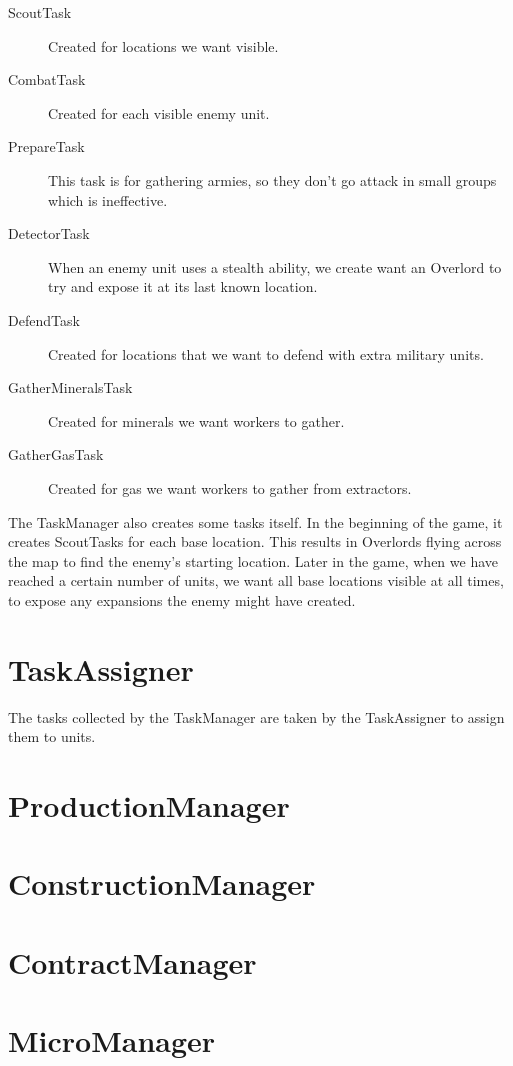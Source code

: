 \begin{description}
\item[ScoutTask] Created for locations we want visible.
\item[CombatTask] Created for each visible enemy unit.
\item[PrepareTask] This task is for gathering armies, so they don't go attack in small groups which is ineffective.
\item[DetectorTask] When an enemy unit uses a stealth ability, we create want an Overlord to try and expose it at its last known location.
\item[DefendTask] Created for locations that we want to defend with extra military units.
\item[GatherMineralsTask] Created for minerals we want workers to gather.
\item[GatherGasTask] Created for gas we want workers to gather from extractors.
\end{description}

The TaskManager also creates some tasks itself. In the beginning of the game, it creates ScoutTasks for each base location. This results in Overlords flying across the map to find the enemy's starting location. Later in the game, when we have reached a certain number of units, we want all base locations visible at all times, to expose any expansions the enemy might have created.

\section{TaskAssigner}

The tasks collected by the TaskManager are taken by the TaskAssigner to assign them to units.

\section{ProductionManager}

\section{ConstructionManager}

\section{ContractManager}

\section{MicroManager}